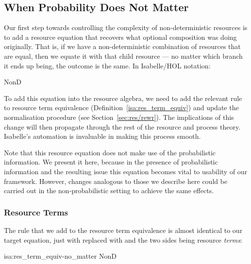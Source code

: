 \documentclass[class=smolathesis,crop=false]{standalone}
\begin{document}
\subsection{When Probability Does Not Matter}
\label{sec:prob/simple-opt/no-matter}

Our first step towards controlling the complexity of non-deterministic resources is to add a resource equation that recovers what optional composition was doing originally.
That is, if we have a non-deterministic combination of resources that are equal, then we equate it with that child resource --- no matter which branch it ends up being, the outcome is the same.
In Isabelle/HOL notation:
\begin{isabelle}
\centering
  NonD\ \ \isacharequal\ 
\end{isabelle}

To add this equation into the resource algebra, we need to add the relevant rule to resource term equivalence (Definition~\ref{isa:res_term_equiv}) and update the normalisation procedure (see Section~\ref{sec:res/rewr}).
The implications of this change will then propagate through the rest of the resource and process theory.
Isabelle's automation is invaluable in making this process smooth.

Note that this resource equation does not make use of the probabilistic information.
We present it here, because in the presence of probabilistic information and the resulting issue this equation becomes vital to usability of our framework.
However, changes analogous to those we describe here could be carried out in the non-probabilistic setting to achieve the same effects.

\subsubsection{Resource Terms}
\label{sec:prob/simple-opt/no-matter/term}

The rule that we add to the resource term equivalence is almost identical to our target equation, just with \isa{\isacharequal} replaced with \isa{\isasymsim} and the two sides being resource \emph{terms}:
\begin{isadef}{isa:res_term_equiv-no_matter}
\centering
  NonD\ \ \isasymsim\ 
\end{isadef}
\end{document}
